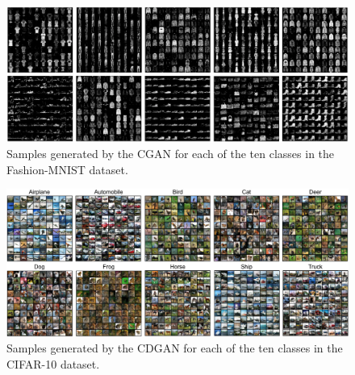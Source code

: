 \begin{figure}
    \centering
    \caption{\label{fig:cGAN_FashionMNIST} Samples generated by the CGAN for each of the ten classes in the Fashion-MNIST dataset.}
    \vspace{-0.1in}
    \includegraphics[width=0.95\columnwidth]{fig_datasynth/fashion-mnist_cGANs.png}     
\end{figure}    


\begin{figure}
    \centering
    \caption{\label{fig:DCGAN_CIFAR10} Samples generated by the CDGAN for each of the ten classes in the CIFAR-10 dataset.}
    \vspace{-0.1in}
    \includegraphics[width=0.95\columnwidth]{fig_datasynth/cifar_cond_DCGAN_large_softLab.png}     
\end{figure}    
